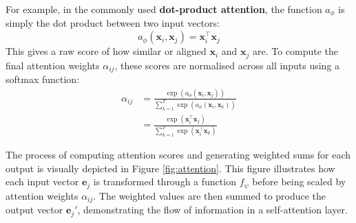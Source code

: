 For example, in the commonly used \textbf{dot-product attention}, the function \( a_\phi \) is simply the dot product between two input vectors:
\[
    a_\phi(\bm{x}_i, \bm{x}_j) = \bm{x}_i^\top \bm{x}_j
\]
This gives a raw score of how similar or aligned \( \bm{x}_i \) and \( \bm{x}_j \) are. To compute the final attention weights \( \alpha_{ij} \), these scores are normalised across all inputs using a softmax function:
\begin{align*}
    \alpha_{ij} & = \frac{\exp(a_\phi(\bm{x}_i, \bm{x}_j))}{\sum_{k=1}^{T} \exp(a_\phi(\bm{x}_i, \bm{x}_k))}                     \\
                & = \frac{\exp \left( \bm{x}_i^\top \bm{x}_j \right)}{\sum_{k=1}^{T} \exp \left( \bm{x}_i^\top \bm{x}_k \right)}
\end{align*}

The process of computing attention scores and generating weighted sums for each output is visually depicted in Figure \ref{fig:attention}. This figure illustrates how each input vector \( \bm{e}_j \) is transformed through a function \( f_\psi \) before being scaled by attention weights \( \alpha_{ij} \). The weighted values are then summed to produce the output vector \( \bm{e}_j' \), demonstrating the flow of information in a self-attention layer.

